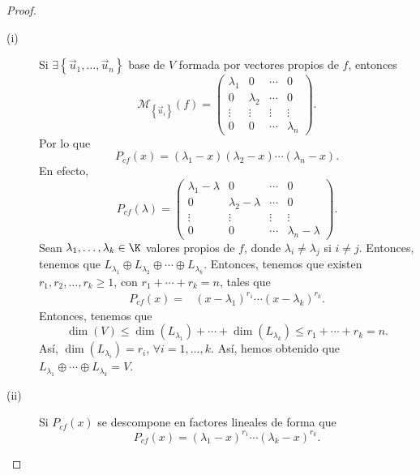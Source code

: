 \begin{proof}
\begin{description}
\item[(i)] Si $\displaystyle \exists \left\{ \vec{u}_{1}, \ldots, \vec{u}_{n}\right\}  $ base de $\displaystyle V $ formada por vectores propios de $\displaystyle f $, entonces
\[\mathcal{M}_{ \left\{ \vec{u}_{i}\right\} }\left(f\right) = \begin{pmatrix} 
	\lambda _{1} & 0 & \cdots & 0 \\
0 & \lambda _{2} & \cdots & 0 \\
\vdots & \vdots & \vdots & \vdots \\
0 & 0 & \cdots & \lambda_{n}\end{pmatrix} .\]
Por lo que 
\[P_{cf}\left(x\right) = \left(\lambda_{1}-x\right)\left(\lambda_{2}-x\right) \cdots \left(\lambda_{n}-x\right) .\]
En efecto, 
\[P_{cf}\left(\lambda \right) = \begin{pmatrix} \lambda _{1} - \lambda & 0 & \cdots & 0 \\
0 & \lambda _{2} - \lambda & \cdots & 0 \\
\vdots & \vdots & \vdots & \vdots \\
0 & 0 & \cdots & \lambda_{n} - \lambda \end{pmatrix} .\]
Sean $\displaystyle \lambda_{1}, \ldots, \lambda_{k} \in \K $ valores propios de $\displaystyle f $, donde $\displaystyle \lambda_{i} \neq \lambda_{j} $ si $\displaystyle i \neq j $. Entonces, tenemos que $\displaystyle L_{\lambda_{1}} \oplus L_{\lambda_{2}} \oplus \cdots \oplus L_{\lambda_{k}} $. Entonces, tenemos que existen $\displaystyle r_{1}, r_{2}, \ldots, r_{k} \geq 1 $, con $\displaystyle r_{1} + \cdots + r_{k}  = n $, tales que
\[
\begin{split}
	P_{cf}\left(x\right) = & \left(x - \lambda_{1}\right)^{r_{1}} \cdots \left(x - \lambda _{k}\right)^{r_{k}} .
\end{split}
\]
Entonces, tenemos que 
\[\dim\left(V\right) \leq \dim\left(L_{\lambda_{1}}\right) + \cdots + \dim\left(L_{\lambda_{k}}\right) \leq r_{1} + \cdots + r_{k} = n .\]
Así, $\displaystyle \dim\left(L_{\lambda_{i}}\right) = r_{i} $, $\displaystyle \forall i = 1, \ldots, k $. Así, hemos obtenido que $\displaystyle L_{\lambda_{1}} \oplus \cdots \oplus L_{\lambda_{k}} = V $.
\item[(ii)] Si $\displaystyle P_{cf}\left(x\right) $ se descompone en factores lineales de forma que 
	\[P_{cf}\left(x\right) = \left(\lambda_{1}-x\right)^{r_{1}}\cdots\left(\lambda_{k}-x\right)^{r_{k}} .\]

\end{description}
\end{proof}
